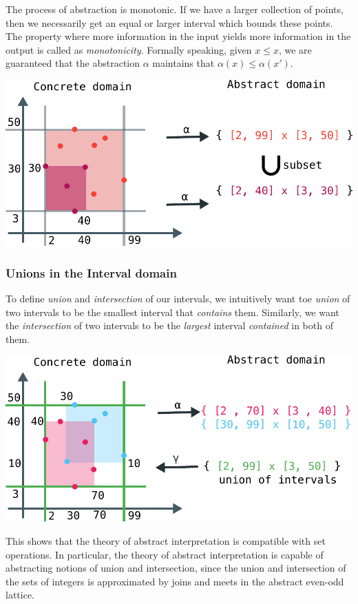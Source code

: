 \documentclass[11pt]{book}
\begin{document}
The process of abstraction is monotonic. If we have a larger collection of points, then we necessarily
get an equal or larger interval which bounds these points. The property where more information
in the input yields more information in the output is called as \emph{monotonicity}. Formally speaking,
given $x \leq x$, we are guaranteed that the abstraction $\alpha$ maintains that $\alpha(x) \leq \alpha(x')$.

\includegraphics[width=\textwidth]{./monotone.pdf}

\subsubsection{Unions in the Interval domain}

To define \emph{union} and \emph{intersection} of our intervals, we intuitively
want toe \emph{union} of two intervals to be the smallest interval that \emph{contains} them.
Similarly, we want the \emph{intersection} of two intervals to be the \emph{largest} interval
\emph{contained} in both of them.


\includegraphics[width=\textwidth]{./union.pdf}

This shows that the theory of abstract interpretation is compatible with set
operations. In particular, the theory of abstract interpretation is capable of
abstracting notions of union and intersection, since the union and intersection
of the sets of integers is approximated by joins and meets in the abstract even-odd
lattice.
\end{document}
